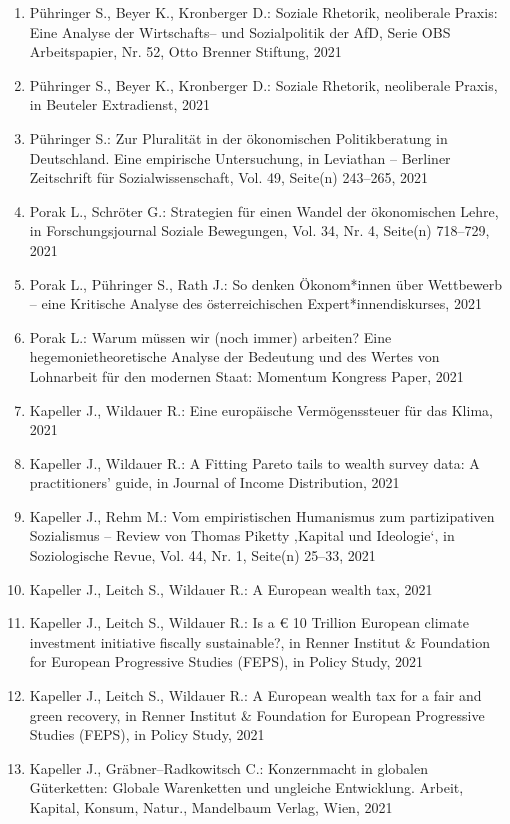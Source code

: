 \begin{enumerate}
	 \item Pühringer S., Beyer K., Kronberger D.: Soziale Rhetorik, neoliberale Praxis: Eine Analyse der Wirtschafts-- und Sozialpolitik der AfD, Serie OBS Arbeitspapier, Nr. 52, Otto Brenner Stiftung, 2021
	 \item Pühringer S., Beyer K., Kronberger D.: Soziale Rhetorik, neoliberale Praxis, in Beuteler Extradienst, 2021
	 \item Pühringer S.: Zur Pluralität in der ökonomischen Politikberatung in Deutschland. Eine empirische Untersuchung, in Leviathan -- Berliner Zeitschrift für Sozialwissenschaft, Vol. 49, Seite(n) 243--265, 2021
	 \item Porak L., Schröter G.: Strategien für einen Wandel der ökonomischen Lehre, in Forschungsjournal Soziale Bewegungen, Vol. 34, Nr. 4, Seite(n) 718--729, 2021
	 \item Porak L., Pühringer S., Rath J.: So denken Ökonom*innen über Wettbewerb – eine Kritische Analyse des österreichischen Expert*innendiskurses, 2021
	 \item Porak L.: Warum müssen wir (noch immer) arbeiten? Eine hegemonietheoretische Analyse der Bedeutung und des Wertes von Lohnarbeit für den modernen Staat: Momentum Kongress Paper, 2021
	 \item Kapeller J., Wildauer R.: Eine europäische Vermögenssteuer für das Klima, 2021
	 \item Kapeller J., Wildauer R.: A Fitting Pareto tails to wealth survey data: A practitioners’ guide, in Journal of Income Distribution, 2021
	 \item Kapeller J., Rehm M.: Vom empiristischen Humanismus zum partizipativen Sozialismus – Review von Thomas Piketty ‚Kapital und Ideologie‘, in Soziologische Revue, Vol. 44, Nr. 1, Seite(n) 25--33, 2021
	 \item Kapeller J., Leitch S., Wildauer R.: A European wealth tax, 2021
	 \item Kapeller J., Leitch S., Wildauer R.: Is a € 10 Trillion European climate investment initiative fiscally sustainable?, in Renner Institut \& Foundation for European Progressive Studies (FEPS), in Policy Study, 2021
	 \item Kapeller J., Leitch S., Wildauer R.: A European wealth tax for a fair and green recovery, in Renner Institut \& Foundation for European Progressive Studies (FEPS), in Policy Study, 2021
	 \item Kapeller J., Gräbner--Radkowitsch C.: Konzernmacht in globalen Güterketten: Globale Warenketten und ungleiche Entwicklung. Arbeit, Kapital, Konsum, Natur., Mandelbaum Verlag, Wien, 2021

\end{enumerate}
